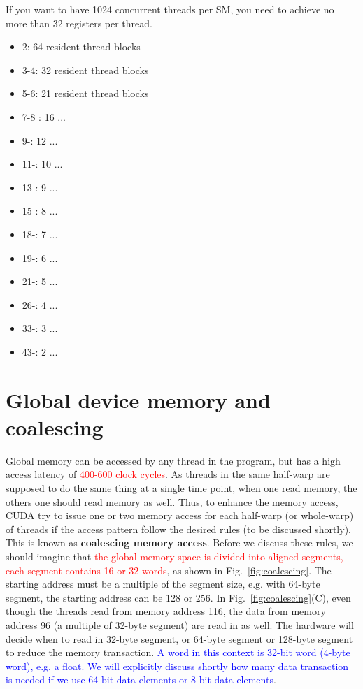 If you want to have 1024 concurrent threads per SM, you need to
achieve no more than 32 registers per thread. 

\begin{itemize}
\item 2: 64 resident thread blocks
\item 3-4: 32 resident thread blocks
\item 5-6: 21 resident thread blocks
\item 7-8 : 16 ...
\item 9-: 12 ...
\item 11-: 10 ...
\item 13-: 9 ...
\item 15-: 8 ...
\item 18-: 7 ...
\item 19-: 6 ...
\item 21-: 5 ...
\item 26-: 4 ...
\item 33-: 3 ...
\item 43-: 2 ...
\end{itemize}

\section{Global device memory and coalescing}
\label{sec:global-memory}

Global memory can be accessed by any thread in the program, but has a
high access latency of \textcolor{red}{400-600 clock cycles}. As
threads in the same half-warp are supposed to do the same thing at a
single time point, when one read memory, the others one should read
memory as well. Thus, to enhance the memory access, CUDA try to issue
one or two memory access for each half-warp (or whole-warp) of threads
if the access pattern follow the desired rules (to be discussed
shortly). This is known as {\bf coalescing memory access}.  Before we
discuss these rules, we should imagine that
\textcolor{red}{the global memory space is divided into aligned
  segments, each segment contains 16 or 32 words},
as shown in Fig.~\ref{fig:coalescing}. The starting address must be a
multiple of the segment size, e.g. with 64-byte segment, the starting
address can be 128 or 256. In Fig.~\ref{fig:coalescing}(C), even
though the threads read from memory address 116, the data from memory
address 96 (a multiple of 32-byte segment) are read in as well. The
hardware will decide when to read in 32-byte segment, or 64-byte
segment or 128-byte segment to reduce the memory transaction.
\textcolor{blue}{A word in this context is 32-bit word (4-byte word),
  e.g. a float. We will explicitly discuss shortly how many data
  transaction is needed if we use 64-bit data elements or 8-bit data
  elements}.

